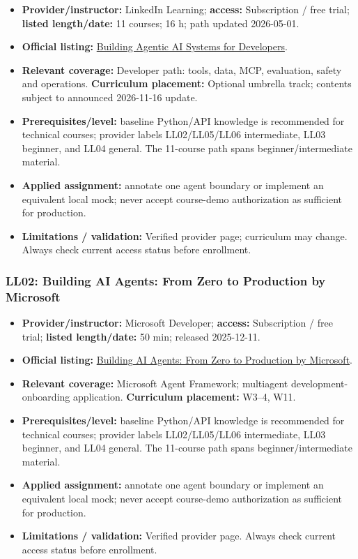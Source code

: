 \documentclass[
  10pt,
]{article}
\providecommand{\tightlist}{%
  \setlength{\itemsep}{0pt}\setlength{\parskip}{0pt}}
\begin{document}
\begin{itemize}
\tightlist
\item
  \textbf{Provider/instructor:} LinkedIn Learning; \textbf{access:}
  Subscription / free trial; \textbf{listed length/date:} 11 courses; 16
  h; path updated 2026-05-01.
\item
  \textbf{Official listing:}
  \href{https://www.linkedin.com/learning/paths/building-agentic-ai-systems-for-developers}{Building
  Agentic AI Systems for Developers}.
\item
  \textbf{Relevant coverage:} Developer path: tools, data, MCP,
  evaluation, safety and operations. \textbf{Curriculum placement:}
  Optional umbrella track; contents subject to announced 2026-11-16
  update.
\item
  \textbf{Prerequisites/level:} baseline Python/API knowledge is
  recommended for technical courses; provider labels LL02/LL05/LL06
  intermediate, LL03 beginner, and LL04 general. The 11-course path
  spans beginner/intermediate material.
\item
  \textbf{Applied assignment:} annotate one agent boundary or implement
  an equivalent local mock; never accept course-demo authorization as
  sufficient for production.
\item
  \textbf{Limitations / validation:} Verified provider page; curriculum
  may change. Always check current access status before enrollment.
\end{itemize}

\subsubsection{LL02: Building AI Agents: From Zero to Production by
Microsoft}\label{ll02-building-ai-agents-from-zero-to-production-by-microsoft}

\begin{itemize}
\tightlist
\item
  \textbf{Provider/instructor:} Microsoft Developer; \textbf{access:}
  Subscription / free trial; \textbf{listed length/date:} 50 min;
  released 2025-12-11.
\item
  \textbf{Official listing:}
  \href{https://www.linkedin.com/learning/building-ai-agents-from-zero-to-production-by-microsoft}{Building
  AI Agents: From Zero to Production by Microsoft}.
\item
  \textbf{Relevant coverage:} Microsoft Agent Framework; multiagent
  development-onboarding application. \textbf{Curriculum placement:}
  W3--4, W11.
\item
  \textbf{Prerequisites/level:} baseline Python/API knowledge is
  recommended for technical courses; provider labels LL02/LL05/LL06
  intermediate, LL03 beginner, and LL04 general. The 11-course path
  spans beginner/intermediate material.
\item
  \textbf{Applied assignment:} annotate one agent boundary or implement
  an equivalent local mock; never accept course-demo authorization as
  sufficient for production.
\item
  \textbf{Limitations / validation:} Verified provider page. Always
  check current access status before enrollment.
\end{itemize}
\end{document}
